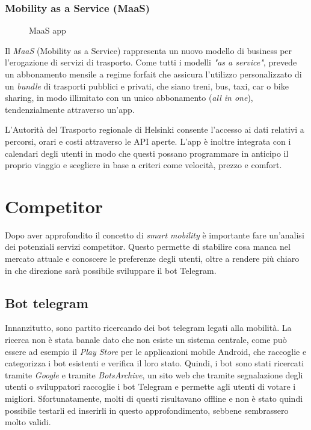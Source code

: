 \subsubsection{Mobility as a Service (MaaS)}

\begin{wrapfigure}{r}{0.4\textwidth}
\centering
{}
\caption{MaaS app}
\label{fig:maas}
\end{wrapfigure}

Il \textit{MaaS} (Mobility as a Service) rappresenta un nuovo modello di business per l'erogazione di servizi di trasporto. Come tutti i modelli \textit{"as a service"}, prevede un abbonamento mensile a regime forfait che assicura l'utilizzo personalizzato di un \textit{bundle} di trasporti pubblici e privati, che siano treni, bus, taxi, car o bike sharing, in modo illimitato con un unico abbonamento (\textit{all in one}), tendenzialmente attraverso un'app. 

L’Autorità del Trasporto regionale di Helsinki consente l’accesso ai dati relativi a percorsi, orari e costi attraverso le API aperte. L’app è inoltre integrata con i calendari degli utenti in modo che questi possano programmare in anticipo il proprio viaggio e scegliere in base a criteri come velocità, prezzo e comfort.

\section{Competitor}
\label{sec:competitor}

Dopo aver approfondito il concetto di \textit{smart mobility} è importante fare un'analisi dei potenziali servizi competitor. Questo permette di stabilire cosa manca nel mercato attuale e conoscere le preferenze degli utenti, oltre a rendere più chiaro in che direzione sarà possibile sviluppare il bot Telegram.

\subsection{Bot telegram}
Innanzitutto, sono partito ricercando dei bot telegram legati alla mobilità. La ricerca non è stata banale dato che non esiste un sistema centrale, come può essere ad esempio il \textit{Play Store} per le applicazioni mobile Android, che raccoglie e categorizza i bot esistenti e verifica il loro stato. Quindi, i bot sono stati ricercati tramite \textit{Google} e tramite \textit{BotsArchive}, un sito web che tramite segnalazione degli utenti o sviluppatori raccoglie i bot Telegram e permette agli utenti di votare i migliori. Sfortunatamente, molti di questi risultavano offline e non è stato quindi possibile testarli ed inserirli in questo approfondimento, sebbene sembrassero molto validi.

